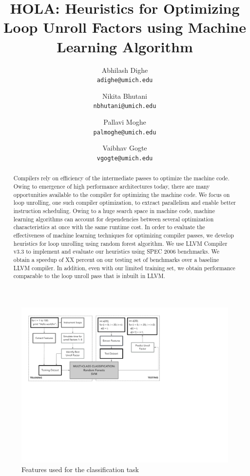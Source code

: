 \documentclass[]{sig-alternate}
\author{
  Abhilash Dighe\\
  \texttt{adighe@umich.edu} 
  \and
  Nikita Bhutani\\
  \texttt{nbhutani@umich.edu}
  \and
  Pallavi Moghe\\
  \texttt{palmoghe@umich.edu} 
  \and
  Vaibhav Gogte\\
  \texttt{vgogte@umich.edu}
}
\title{HOLA: Heuristics for Optimizing Loop Unroll Factors using Machine Learning Algorithm\\\vspace{-4mm}}
\begin{document}
\makeatletter
\def\@copyrightspace{\relax}
\makeatother

\maketitle




\begin{abstract}
Compilers rely on efficiency of the intermediate passes to optimize the machine code. Owing to emergence of high performance architectures today, there are many opportunities available to the compiler for optimizing the machine code. We focus on loop unrolling, one such compiler optimization, to extract parallelism and enable better instruction scheduling. Owing to a huge search space in machine code, machine learning algorithms can account for dependencies between several optimization characteristics at once with the same runtime cost. In order to evaluate the effectiveness of machine learning techniques for optimizing compiler passes, we develop heuristics for loop unrolling using random forest algorithm.  We use LLVM Compiler v3.3 to implement and evaluate our heuristics using SPEC 2006 benchmarks. We obtain a speedup of XX percent on our testing set of benchmarks over a baseline LLVM compiler. In addition, even with our limited training set, we obtain performance comparable to the loop unroll pass that is inbuilt in LLVM.
\end{abstract}

\begin{figure}
  \center
  \includegraphics[width=0.90\linewidth]{fig/systemArchitecture.pdf}
  \caption{Features used for the classification task}
  \label{fig:systemArchitechture}
\end{figure}
\end{document}
